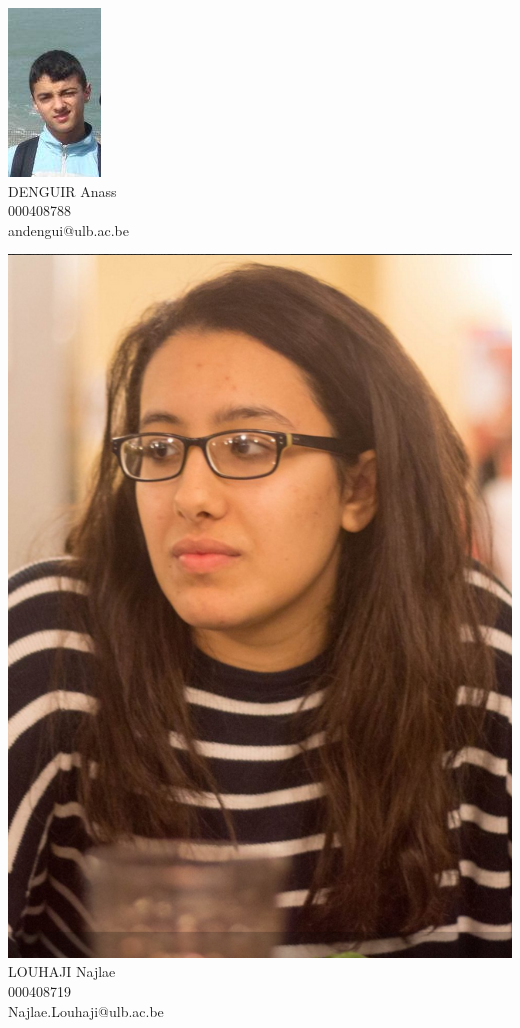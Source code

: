 \documentclass[12pt]{report}
\begin{document}
\begin{minipage}{0.4\textwidth}
        \begin{center} \large
        	\includegraphics[scale=1.3]{Anass.PNG}\\
            \small DENGUIR Anass\\
			\small 000408788\\
			\small andengui@ulb.ac.be
            \end{center}
            \end{minipage}\hfill
            \begin{minipage}{0.4\textwidth}
            \begin{center} \large
            \includegraphics[scale=0.24]{Najlae.PNG}\\
            \small LOUHAJI Najlae\\  
            \small 000408719\\
            \small Najlae.Louhaji@ulb.ac.be
        \end{center}
    \end{minipage}\\[1 cm]
\end{document}
